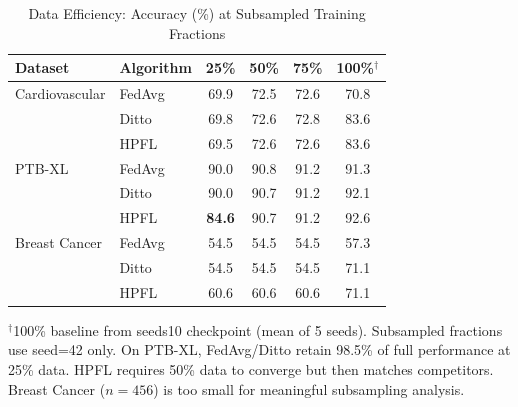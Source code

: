\documentclass[conference,a4paper]{IEEEtran}
\begin{document}
\begin{table}[htbp]
\centering
\caption{Data Efficiency: Accuracy (\%) at Subsampled Training Fractions}
\label{tab:data_efficiency}
\small
\begin{tabular}{llcccc}
\toprule
\textbf{Dataset} & \textbf{Algorithm} & \textbf{25\%} & \textbf{50\%} & \textbf{75\%} & \textbf{100\%}$^\dagger$ \\
\midrule
Cardiovascular & FedAvg & 69.9 & 72.5 & 72.6 & 70.8 \\
 & Ditto & 69.8 & 72.6 & 72.8 & 83.6 \\
 & HPFL & 69.5 & 72.6 & 72.6 & 83.6 \\
\midrule
PTB-XL & FedAvg & 90.0 & 90.8 & 91.2 & 91.3 \\
 & Ditto & 90.0 & 90.7 & 91.2 & 92.1 \\
 & HPFL & \textbf{84.6} & 90.7 & 91.2 & 92.6 \\
\midrule
Breast Cancer & FedAvg & 54.5 & 54.5 & 54.5 & 57.3 \\
 & Ditto & 54.5 & 54.5 & 54.5 & 71.1 \\
 & HPFL & 60.6 & 60.6 & 60.6 & 71.1 \\
\bottomrule
\end{tabular}

\vspace{1mm}
\footnotesize{$^\dagger$100\% baseline from seeds10 checkpoint (mean of 5 seeds). Subsampled fractions use seed=42 only. On PTB-XL, FedAvg/Ditto retain 98.5\% of full performance at 25\% data. HPFL requires 50\% data to converge but then matches competitors. Breast Cancer ($n{=}456$) is too small for meaningful subsampling analysis.}
\end{table}
\end{document}
